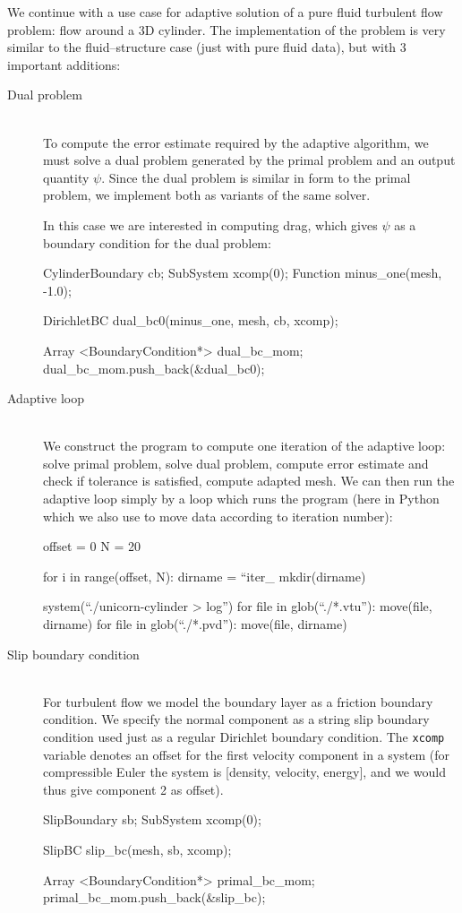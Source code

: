 We continue with a use case for adaptive solution of a pure fluid
turbulent flow problem: flow around a 3D cylinder. The implementation
of the problem is very similar to the fluid--structure case (just with
pure fluid data), but with 3 important additions:
\begin{description}
\item[Dual problem]
\ \\
To compute the error estimate required by the adaptive algorithm, we
must solve a dual problem generated by the primal problem and an
output quantity $\psi$. Since the dual problem is similar in form to
the primal problem, we implement both as variants of the same solver.

In this case we are interested in computing drag, which gives $\psi$
as a boundary condition for the dual problem:

\begin{c++}
CylinderBoundary cb;
SubSystem xcomp(0);
Function minus_one(mesh, -1.0);

DirichletBC dual_bc0(minus_one, mesh, cb, xcomp);

Array <BoundaryCondition*> dual_bc_mom;
dual_bc_mom.push_back(&dual_bc0);
\end{c++}


\item[Adaptive loop]
\ \\
We construct the program to compute one iteration of the adaptive
loop: solve primal problem, solve dual problem, compute error estimate
and check if tolerance is satisfied, compute adapted mesh. We can then
run the adaptive loop simply by a loop which runs the program (here in
Python which we also use to move data according to iteration number):


\begin{python}
offset = 0
N = 20

for i in range(offset, N):
    dirname = ``iter_%
    mkdir(dirname)

    system(``./unicorn-cylinder > log'')
    for file in glob(``./*.vtu''):
    move(file, dirname)
    for file in glob(``./*.pvd''):
    move(file, dirname)
\end{python}


\item[Slip boundary condition]
\ \\
For turbulent flow we model the boundary layer as a friction boundary
condition. We specify the normal component as a string slip boundary
condition used just as a regular Dirichlet boundary condition. The
{\tt xcomp} variable denotes an offset for the first velocity
component in a system (for compressible Euler the system is [density,
velocity, energy], and we would thus give component 2 as offset).

\begin{c++}
SlipBoundary sb;
SubSystem xcomp(0);

SlipBC slip_bc(mesh, sb, xcomp);

Array <BoundaryCondition*> primal_bc_mom;
primal_bc_mom.push_back(&slip_bc);
\end{c++}


\end{description}



